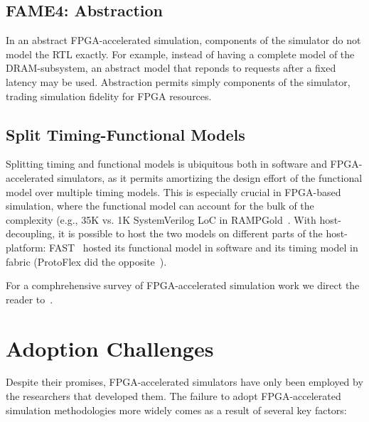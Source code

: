 \subsection{FAME4: Abstraction}

In an abstract FPGA-accelerated simulation, components of the simulator do not
model the RTL exactly. For example, instead of having a complete model of the
DRAM-subsystem, an abstract model that reponds to requests after a fixed
latency may be used. Abstraction permits simply components of the simulator,
trading simulation fidelity for FPGA resources.

\subsection{Split Timing-Functional Models}

Splitting timing and functional models is ubiquitous both in software and
FPGA-accelerated simulators, as it permits amortizing the design effort of the
functional model over multiple timing models. This is especially crucial in
FPGA-based simulation, where the functional model can account for the bulk of
the complexity (e.g., 35K vs. 1K SystemVerilog LoC in RAMPGold~\cite{rampgold}. With
host-decoupling, it is possible to host the two models on different parts of
the host-platform: FAST~\cite{fast} hosted its functional model in software and its
timing model in fabric (ProtoFlex did the opposite~\cite{protoflex}).

For a comphrehensive survey of FPGA-accelerated simulation work we direct
the reader to~\cite{fpgasimbook}.

\section{Adoption Challenges}

Despite their promises, FPGA-accelerated simulators have only been employed by
the researchers that developed them. The failure to adopt FPGA-accelerated
simulation methodologies more widely comes as a result of several key factors:

